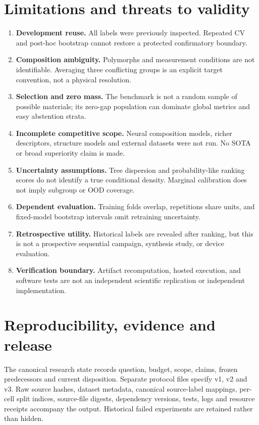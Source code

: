 \documentclass[11pt]{article}
\begin{document}
\section{Limitations and threats to validity}
\begin{enumerate}[leftmargin=*]
\item \textbf{Development reuse.} All labels were previously inspected. Repeated CV and post-hoc bootstrap cannot restore a protected confirmatory boundary.
\item \textbf{Composition ambiguity.} Polymorphs and measurement conditions are not identifiable. Averaging three conflicting groups is an explicit target convention, not a physical resolution.
\item \textbf{Selection and zero mass.} The benchmark is not a random sample of possible materials; its zero-gap population can dominate global metrics and easy abstention strata.
\item \textbf{Incomplete competitive scope.} Neural composition models, richer descriptors, structure models and external datasets were not run. No SOTA or broad superiority claim is made.
\item \textbf{Uncertainty assumptions.} Tree dispersion and probability-like ranking scores do not identify a true conditional density. Marginal calibration does not imply subgroup or OOD coverage.
\item \textbf{Dependent evaluation.} Training folds overlap, repetitions share units, and fixed-model bootstrap intervals omit retraining uncertainty.
\item \textbf{Retrospective utility.} Historical labels are revealed after ranking, but this is not a prospective sequential campaign, synthesis study, or device evaluation.
\item \textbf{Verification boundary.} Artifact recomputation, hosted execution, and software tests are not an independent scientific replication or independent implementation.
\end{enumerate}

\section{Reproducibility, evidence and release}
The canonical research state records question, budget, scope, claims, frozen predecessors and current disposition. Separate protocol files specify v1, v2 and v3. Raw source hashes, dataset metadata, canonical source-label mappings, per-cell split indices, source-file digests, dependency versions, tests, logs and resource receipts accompany the output. Historical failed experiments are retained rather than hidden.
\end{document}
